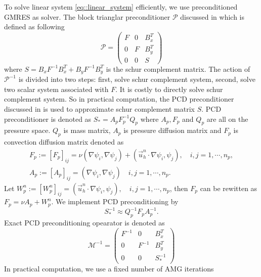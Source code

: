 \documentclass{eajam}
\begin{document}
  To solve linear system \ref{eq::linear_system} efficiently, we 
  use preconditioned GMRES as solver. The block trianglar
  preconditioner $\mathcal{P}$ discussed in \cite{elman2005finite}
  which is defined as following
  \begin{equation}
    \mathcal{P} = 
    \left( 
      \begin{array}{lll}
        F & 0 & B_x^T \\
        0 & F  & B_y^T \\
        0 & 0 & S
      \end{array}
    \right)
  \end{equation}
  where $S = B_xF^{-1}B_x^T + B_yF^{-1}B_y^T$ is the schur complement
  matrix. The action of $\mathcal{P}^{-1}$ is divided into two steps:
  first, solve schur complement system, second, solve two scalar
  system associated with $F$. It is costly to directly solve schur
  complement system. So in practical computation, the PCD
  preconditioner discussed in \cite{elman2005finite} is used to
  approximate schur complement matrix $S$. PCD preconditioner is
  denoted as $S_* = A_p F_p^{-1} Q_p$ where $A_p, F_p$ and $Q_p$ are
  all on the pressure space. $Q_p$ is mass matrix, $A_p$ is pressure
  diffusion matrix and $F_p$ is convection diffusion matrix denoted as
  \begin{eqnarray}
    F_p := [F_p]_{ij} = \nu (\nabla \psi_i, \nabla \psi_j) +
    (\vec{u}_h^n \cdot \nabla \psi_i, \psi_j), \quad i,j = 1, \cdots, n_p, \\
    A_p := [A_p]_{ij} = (\nabla \psi_i, \nabla \psi_j)\quad i,j = 1, \cdots,
    n_p.
    \label{eq::pcd_mat}
  \end{eqnarray}
  Let $W_p^n := [W_p^n]_{ij} = (\vec{u}_h^n \cdot \nabla \psi_i,
  \psi_j), \quad i,j = 1, \cdots, n_p$, then $F_p$ can be rewitten as
  $F_p = \nu A_p + W_p^n$. We implement PCD preconditioning by 
  \begin{equation}
    S_*^{-1} \approx Q_p^{-1} F_p A_p^{-1}.
  \end{equation}
  Exact PCD preconditioning opearator is denoted as 
  \begin{equation}
    \mathcal{M}^{-1} = 
    \left(
      \begin{array}{lll}
        F^{-1} & 0 & B_x^T \\
        0 & F^{-1} & B_y^T \\
        0 & 0 &S_*^{-1}
      \end{array}
    \right)
  \end{equation}
  In practical computation, we use a fixed number of AMG iterations
\end{document}
